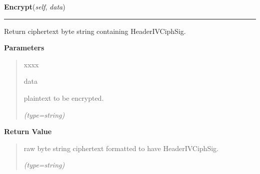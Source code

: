 \hspace{.8\funcindent}\begin{boxedminipage}{\funcwidth}

    \raggedright \textbf{Encrypt}(\textit{self}, \textit{data})

    \vspace{-1.5ex}

    \rule{\textwidth}{0.5\fboxrule}
\setlength{\parskip}{2ex}
    Return ciphertext byte string containing 
    Header{\textbar}IV{\textbar}Ciph{\textbar}Sig.

\setlength{\parskip}{1ex}
      \textbf{Parameters}
      \vspace{-1ex}

      \begin{quote}
        \begin{Ventry}{xxxx}

          \item[data]

          plaintext to be encrypted.

            {\it (type=string)}

        \end{Ventry}

      \end{quote}

      \textbf{Return Value}
    \vspace{-1ex}

      \begin{quote}
      raw byte string ciphertext formatted to have 
      Header{\textbar}IV{\textbar}Ciph{\textbar}Sig.

      {\it (type=string)}

      \end{quote}

    \end{boxedminipage}

    \label{keyczar:keys:AesKey:Decrypt}

    \vspace{0.5ex}

